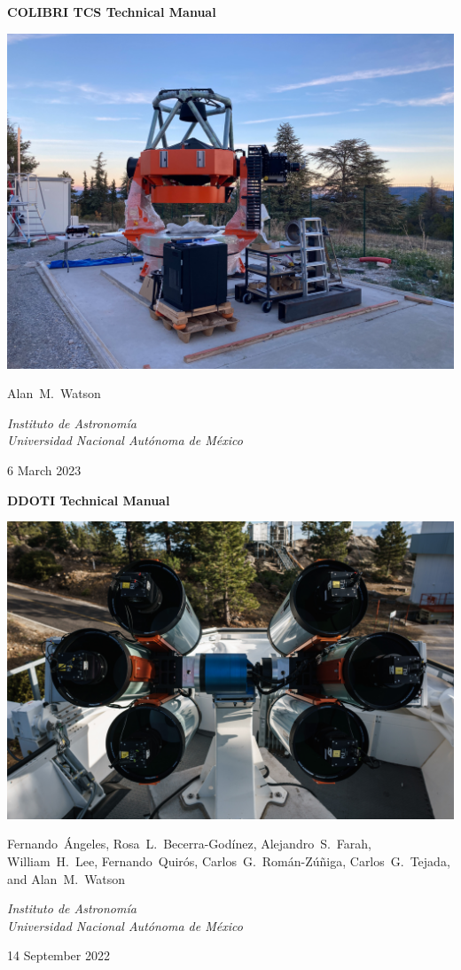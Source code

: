 \begin{centering}
{
 \Large
 \bfseries 
 COLIBRI TCS Technical Manual
 \par
}
\bigskip
\bigskip
\includegraphics[width=\linewidth]{figures/frontmatter-colibri.jpg}

\bigskip
\bigskip
{
\baselineskip=10pt
 \large
 Alan~M.~Watson
 \par
}
\bigskip
{
 \large
 \itshape 
 Instituto de Astronomía\\
 Universidad Nacional Autónoma de México
 \par
}
\bigskip
{
 \large
 6 March 2023
}
\fi

\ifddoti
\bigskip
\bigskip

{
 \Large
 \bfseries 
 DDOTI Technical Manual
 \par
}
\bigskip
\bigskip
\includegraphics[width=\linewidth]{figures/frontmatter-ddoti.jpg}

\bigskip
\bigskip
{
\baselineskip=10pt
 \large
 Fernando~Ángeles,
 Rosa~L.~Becerra-Godínez,
 Alejandro~S.~Farah,
 William~H.~Lee,
 Fernando~Quirós,
 Carlos~G.~Román-Zúñiga,
 Carlos~G.~Tejada,
 and
 Alan~M.~Watson
 \par
}
\bigskip
{
 \large
 \itshape 
 Instituto de Astronomía\\
 Universidad Nacional Autónoma de México
 \par
}
\bigskip
{
 \large
 14 September 2022
}
\fi

\end{centering}

\newpage

\pagestyle{plain}


\tableofcontents

